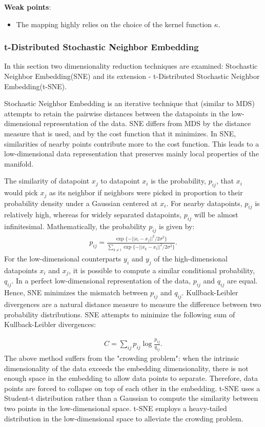 \documentclass[a4paper]{article}
\begin{document}
\textbf{Weak points}:
\begin{itemize}
  \item The mapping highly relies on the choice of the kernel function $\kappa$.
\end{itemize}

\subsubsection{t-Distributed Stochastic Neighbor Embedding}
In this section two dimensionality reduction techniques are examined:
Stochastic Neighbor Embedding(SNE) and its extension - t-Distributed
Stochastic Neighbor Embedding(t-SNE).

Stochastic Neighbor Embedding is an iterative technique that (similar to MDS) attempts to retain the pairwise
distances between the datapoints in the low-dimensional representation
of the data. SNE differs from MDS by the distance measure that is used, and by the cost function that it minimizes. In SNE, similarities of nearby points
contribute more to the cost function. This leads to a low-dimensional
data representation that preserves mainly local properties of the manifold.

The similarity of datapoint $x_j$ to datapoint $x_i$ is the
probability, $p_{ij}$, that $x_i$ would pick $x_j$ as its neighbor
if neighbors were picked in proportion to their probability density
under a Gaussian centered at $x_i$. For nearby datapoints, $p_{ij}$ is relatively high, whereas for widely separated datapoints, $p_{ij}$ will be
almost infinitesimal. Mathematically, the probability $p_{ij}$ is given by:
\begin{align*}
p_{ij}=\frac{\exp\{-||x_i-x_j||^2/2\sigma^2\}}{\sum_{k \neq l}\exp\{-||x_k-x_l||^2/2\sigma^2\}}.
\end{align*}
For the low-dimensional counterparts $y_i$ and $y_j$ of the
high-dimensional datapoints $x_i$ and $x_j$, it is possible to compute
a similar conditional probability, $q_{ij}$.
In a perfect low-dimensional representation of the data, $p_{ij}$ and
$q_{ij}$ are equal. Hence, SNE minimizes the mismatch between
$p_{ij}$ and $q_{ij}$. Kullback-Leibler divergences are a natural
distance measure to measure the difference between two probability distributions. SNE attempts to minimize the following sum of Kullback-Leibler divergences:

\begin{align*}
 C=\sum_{ij}p_{ij}\log\frac{p_{ij}}{q_{ij}}.
\end{align*}
The above method suffers from the "crowding problem": when the intrinsic dimensionality of the data exceeds the embedding dimensionality, there is
not enough space in the embedding to allow data points to separate.
Therefore, data points are forced to collapse on top of each other
in the embedding. t-SNE uses a Student-t distribution rather than a Gaussian to
compute the similarity between two points in the low-dimensional
space. t-SNE employs a heavy-tailed distribution in the low-dimensional space to alleviate the crowding problem.
\end{document}
